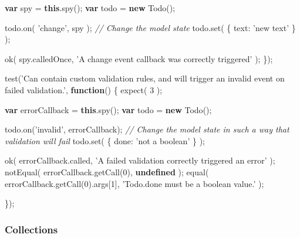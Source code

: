 \documentclass[9pt]{book}
\newenvironment{Shaded}{}{}
\newcommand{\KeywordTok}[1]{\textcolor[rgb]{0.00,0.44,0.13}{\textbf{{#1}}}}
\newcommand{\DataTypeTok}[1]{\textcolor[rgb]{0.56,0.13,0.00}{{#1}}}
\newcommand{\DecValTok}[1]{\textcolor[rgb]{0.25,0.63,0.44}{{#1}}}
\newcommand{\StringTok}[1]{\textcolor[rgb]{0.25,0.44,0.63}{{#1}}}
\newcommand{\CommentTok}[1]{\textcolor[rgb]{0.38,0.63,0.69}{\textit{{#1}}}}
\newcommand{\OtherTok}[1]{\textcolor[rgb]{0.00,0.44,0.13}{{#1}}}
\newcommand{\FunctionTok}[1]{\textcolor[rgb]{0.02,0.16,0.49}{{#1}}}
\newcommand{\NormalTok}[1]{{#1}}
\begin{document}
\begin{Shaded}
\begin{Highlighting}[]
    \KeywordTok{var} \NormalTok{spy = }\KeywordTok{this}\NormalTok{.}\FunctionTok{spy}\NormalTok{();}
    \KeywordTok{var} \NormalTok{todo = }\KeywordTok{new} \FunctionTok{Todo}\NormalTok{();}

    \OtherTok{todo}\NormalTok{.}\FunctionTok{on}\NormalTok{( }\StringTok{'change'}\NormalTok{, spy );}
    \CommentTok{// Change the model state}
    \OtherTok{todo}\NormalTok{.}\FunctionTok{set}\NormalTok{( \{ }\DataTypeTok{text}\NormalTok{: }\StringTok{'new text'} \NormalTok{\} );}

    \FunctionTok{ok}\NormalTok{( }\OtherTok{spy}\NormalTok{.}\FunctionTok{calledOnce}\NormalTok{, }\StringTok{'A change event callback was correctly triggered'} \NormalTok{);}
\NormalTok{\});}


\FunctionTok{test}\NormalTok{(}\StringTok{'Can contain custom validation rules, and will trigger an invalid event on failed validation.'}\NormalTok{, }\KeywordTok{function}\NormalTok{() \{}
    \FunctionTok{expect}\NormalTok{( }\DecValTok{3} \NormalTok{);}

    \KeywordTok{var} \NormalTok{errorCallback = }\KeywordTok{this}\NormalTok{.}\FunctionTok{spy}\NormalTok{();}
    \KeywordTok{var} \NormalTok{todo = }\KeywordTok{new} \FunctionTok{Todo}\NormalTok{();}

    \OtherTok{todo}\NormalTok{.}\FunctionTok{on}\NormalTok{(}\StringTok{'invalid'}\NormalTok{, errorCallback);}
    \CommentTok{// Change the model state in such a way that validation will fail}
    \OtherTok{todo}\NormalTok{.}\FunctionTok{set}\NormalTok{( \{ }\DataTypeTok{done}\NormalTok{: }\StringTok{'not a boolean'} \NormalTok{\} );}

    \FunctionTok{ok}\NormalTok{( }\OtherTok{errorCallback}\NormalTok{.}\FunctionTok{called}\NormalTok{, }\StringTok{'A failed validation correctly triggered an error'} \NormalTok{);}
    \FunctionTok{notEqual}\NormalTok{( }\OtherTok{errorCallback}\NormalTok{.}\FunctionTok{getCall}\NormalTok{(}\DecValTok{0}\NormalTok{), }\KeywordTok{undefined} \NormalTok{);}
    \FunctionTok{equal}\NormalTok{( }\OtherTok{errorCallback}\NormalTok{.}\FunctionTok{getCall}\NormalTok{(}\DecValTok{0}\NormalTok{).}\FunctionTok{args}\NormalTok{[}\DecValTok{1}\NormalTok{], }\StringTok{'Todo.done must be a boolean value.'} \NormalTok{);}

\NormalTok{\});}
\end{Highlighting}
\end{Shaded}

\subsubsection{Collections}\label{collections-2}
\end{document}
